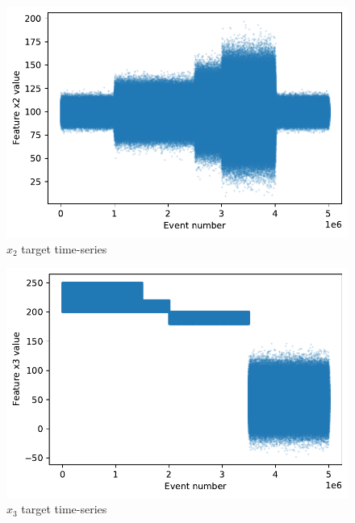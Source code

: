 \documentclass[sigconf]{acmart}
\begin{document}
\begin{figure}[!htb]
    \begin{center}
      \includegraphics[scale=0.5]{figures/timeseries-t6-x2.pdf} 
      \caption{$x_2$ target time-series} 
      \label{fig:timeseries-t6-x2} 
    \end{center}
\end{figure}
\begin{figure}[!htb]
    \begin{center}
      \includegraphics[scale=0.5]{figures/timeseries-t6-x3.pdf} 
      \caption{$x_3$ target time-series} 
      \label{fig:timeseries-t6-x3} 
    \end{center}
\end{figure}
\end{document}
